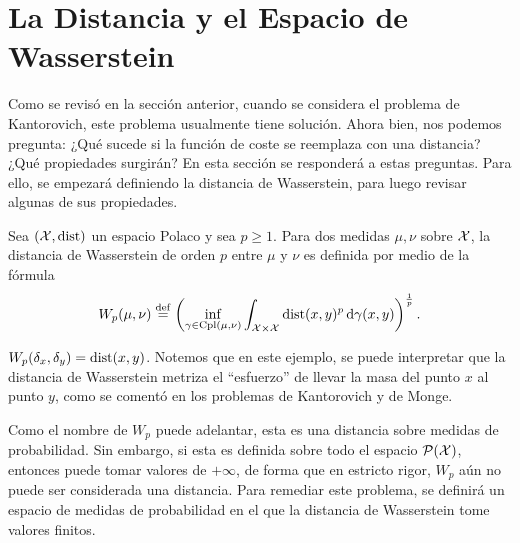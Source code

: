 {{  }

  \section{La Distancia y el Espacio de Wasserstein}\label{sec:la-distancia-y-el-espacio-de-Wasserstein}
  {
	  Como se revisó en la sección anterior, cuando se considera el problema de Kantorovich, este problema usualmente tiene solución. Ahora bien, nos podemos pregunta: ¿Qué sucede si la función de coste se reemplaza con una distancia? ¿Qué propiedades surgirán? En esta sección se responderá a estas preguntas. Para ello, se empezará definiendo la distancia de Wasserstein, para luego revisar algunas de sus propiedades.

	  \begin{definition}\label{def:distanciaWasserstein}
		  Sea $(\cX, \dist)$ un espacio Polaco y sea $p \geq 1$. Para dos medidas $\mu, \nu$ sobre $\cX$, la distancia de Wasserstein de orden $p$ entre $\mu$ y $\nu$ es definida por medio de la fórmula
		  \begin{equation}
			  \label{eq:distanciaWasserstein}
			  \Wasserstein[p]{\mu}{\nu}  \eqdef \left( \inf_{\gamma \in \Cpl(\mu, \nu)} \int_{\cX \times \cX} \dist(x, y)^{p} \dgamma[x, y] \right)^{\frac{1}{p}}.
		  \end{equation}

	  \end{definition}

	  \begin{example}
		  $\Wasserstein[p]{\delta_x}{\delta_y} = \dist(x, y)$. Notemos que en este ejemplo, se puede interpretar que la distancia de Wasserstein metriza el ``esfuerzo'' de llevar la masa del punto $x$ al punto $y$, como se comentó en los problemas de Kantorovich y de Monge.
	  \end{example}

	  Como el nombre de $W_p$ puede adelantar, esta es una distancia sobre medidas de probabilidad. Sin embargo, si esta es definida sobre todo el espacio $\ProbSpace[\cX]$, entonces puede tomar valores de $+\infty$, de forma que en estricto rigor, $W_p$ aún no puede ser considerada una distancia.
	  Para remediar este problema, se definirá un espacio de medidas de probabilidad en el que la distancia de Wasserstein tome valores finitos.

}}
